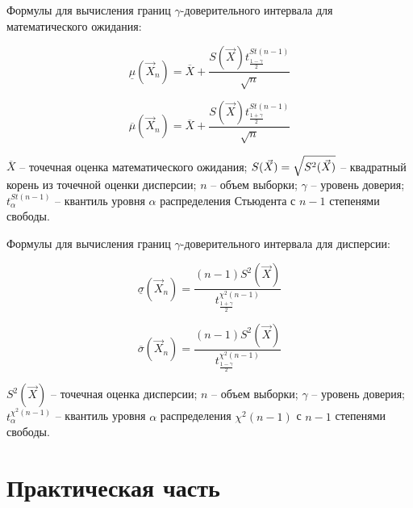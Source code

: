 \documentclass[12pt]{report}
\begin{document}
Формулы для вычисления границ $\gamma$-доверительного интервала для математического ожидания:

\begin{equation}
\underline\mu(\vec X_n)=\overline X + \frac{S(\vec X)t^{St(n-1)}_{\frac{1-\gamma}{2}}}{\sqrt{n}}
\end{equation}

\begin{equation}
\overline\mu(\vec X_n)=\overline X + \frac{S(\vec X)t^{St(n-1)}_{\frac{1+\gamma}{2}}}{\sqrt{n}}
\end{equation}

$\overline X$ -- точечная оценка математического ожидания;
$S(\vec X) = \sqrtsign{S^2(\vec X)}$ -- квадратный корень из точечной оценки дисперсии;
$n$ -- объем выборки;
$\gamma$ -- уровень доверия;
$t^{St(n-1)}_{\alpha}$ -- квантиль уровня $\alpha$ распределения Стьюдента с $n - 1$ степенями свободы.

Формулы для вычисления границ $\gamma$-доверительного интервала для дисперсии:

\begin{equation}
\underline\sigma(\vec X_n)= \frac{(n-1)S^2(\vec X)}{t^{\chi^2(n-1)}_{\frac{1+\gamma}{2}}}
\end{equation}

\begin{equation}
\overline\sigma(\vec X_n)= \frac{(n-1)S^2(\vec X)}{t^{\chi^2(n-1)}_{\frac{1-\gamma}{2}}}
\end{equation}

$S^2(\vec X)$ -- точечная оценка дисперсии;
$n$ -- объем выборки;
$\gamma$ -- уровень доверия;
$t^{\chi^2(n-1)}_{\alpha}$ -- квантиль уровня $\alpha$ распределения $\chi^2(n-1)$ с $n - 1$ степенями свободы.


\chapter{Практическая часть}
\end{document}
